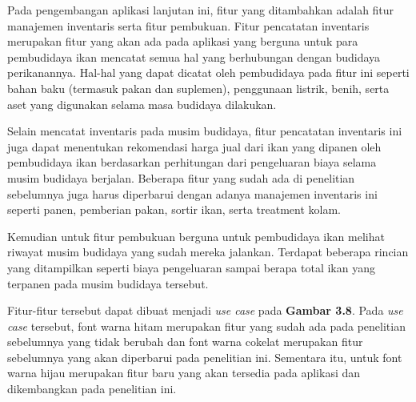 \begin{spacing}{1.5}
Pada pengembangan aplikasi lanjutan ini, fitur yang ditambahkan adalah fitur manajemen inventaris serta fitur pembukuan. Fitur pencatatan inventaris merupakan fitur yang akan ada pada aplikasi yang berguna untuk para pembudidaya ikan mencatat semua hal yang berhubungan dengan budidaya perikanannya. Hal-hal yang dapat dicatat oleh pembudidaya pada fitur ini seperti bahan baku (termasuk pakan dan suplemen), penggunaan listrik, benih, serta aset yang digunakan selama masa budidaya dilakukan.

Selain mencatat inventaris pada musim budidaya, fitur pencatatan inventaris ini juga dapat menentukan rekomendasi harga jual dari ikan yang dipanen oleh pembudidaya ikan berdasarkan perhitungan dari pengeluaran biaya selama musim budidaya berjalan. Beberapa fitur yang sudah ada di penelitian sebelumnya juga harus diperbarui dengan adanya manajemen inventaris ini seperti panen, pemberian pakan, sortir ikan, serta treatment kolam.

Kemudian untuk fitur pembukuan berguna untuk pembudidaya ikan melihat riwayat musim budidaya yang sudah mereka jalankan. Terdapat beberapa rincian yang ditampilkan seperti biaya pengeluaran sampai berapa total ikan yang terpanen pada musim budidaya tersebut.

Fitur-fitur tersebut dapat dibuat menjadi \textit{use case} pada \textbf{Gambar 3.8}. Pada \textit{use case} tersebut, font warna hitam merupakan fitur yang sudah ada pada penelitian sebelumnya yang tidak berubah dan font warna cokelat merupakan fitur sebelumnya yang akan diperbarui pada penelitian ini. Sementara itu, untuk font warna hijau merupakan fitur baru yang akan tersedia pada aplikasi dan dikembangkan pada penelitian ini.


\end{spacing}
